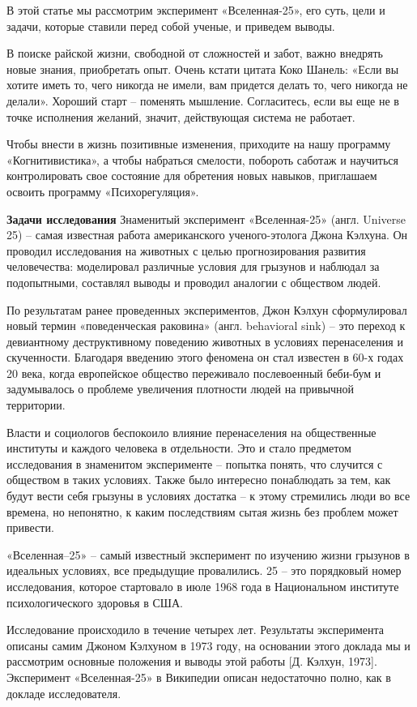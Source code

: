 В этой статье мы рассмотрим эксперимент «Вселенная-25», его суть, цели и задачи, которые ставили перед собой ученые, и приведем выводы.

В поиске райской жизни, свободной от сложностей и забот, важно внедрять новые знания, приобретать опыт. Очень кстати цитата Коко Шанель: «Если вы хотите иметь то, чего никогда не имели, вам придется делать то, чего никогда не делали». Хороший старт – поменять мышление. Согласитесь, если вы еще не в точке исполнения желаний, значит, действующая система не работает.

Чтобы внести в жизнь позитивные изменения, приходите на нашу программу «Когнитивистика», а чтобы набраться смелости, побороть саботаж и научиться контролировать свое состояние для обретения новых навыков, приглашаем освоить программу «Психорегуляция».

\textbf{Задачи исследования}
Знаменитый эксперимент «Вселенная-25» (англ. Universe 25) – самая известная работа американского ученого-этолога Джона  Кэлхуна. Он проводил исследования на животных с целью прогнозирования развития человечества: моделировал различные условия для грызунов и наблюдал за подопытными, составлял выводы и проводил аналогии с обществом людей.

По результатам ранее проведенных экспериментов, Джон  Кэлхун сформулировал новый термин «поведенческая раковина» (англ. behavioral sink) – это переход к девиантному деструктивному поведению животных в условиях перенаселения и скученности. Благодаря введению этого феномена он стал известен в 60-х годах 20 века, когда европейское общество переживало послевоенный беби-бум и задумывалось о проблеме увеличения плотности людей на привычной территории.

Власти и социологов беспокоило влияние перенаселения на общественные институты и каждого человека в отдельности. Это и стало предметом исследования в знаменитом эксперименте – попытка понять, что случится с обществом в таких условиях. Также было интересно понаблюдать за тем, как будут вести себя грызуны в условиях достатка – к этому стремились люди во все времена, но непонятно, к каким последствиям сытая жизнь без проблем может привести.

«Вселенная–25» – самый известный эксперимент по изучению жизни грызунов в идеальных условиях, все предыдущие провалились. 25 – это порядковый номер исследования, которое стартовало в июле 1968 года в Национальном институте психологического здоровья в США.

Исследование происходило в течение четырех лет. Результаты эксперимента описаны самим Джоном  Кэлхуном в 1973 году, на основании этого доклада мы и рассмотрим основные положения и выводы этой работы [Д.  Кэлхун, 1973]. Эксперимент «Вселенная-25» в Википедии описан недостаточно полно, как в докладе исследователя.

